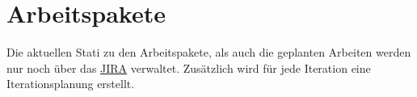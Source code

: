 \chapter{Arbeitspakete}

Die aktuellen Stati zu den Arbeitspakete, als auch die geplanten Arbeiten werden nur noch über das \href{http://sinv-56086.edu.hsr.ch:40010/}{JIRA} verwaltet. Zusätzlich wird für jede Iteration eine Iterationsplanung erstellt.
